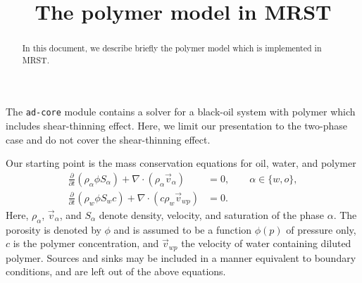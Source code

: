 \documentclass[11pt]{amsart}
\begin{document}
\title[Polymer model]{The polymer model in MRST}

\maketitle

\begin{abstract}
  In this document, we describe briefly the polymer model which is implemented in MRST. 
\end{abstract}

The \texttt{ad-core} module contains a solver for a black-oil system with polymer which includes
shear-thinning effect. Here, we limit our presentation to the two-phase case and do not cover the
shear-thinning effect.

Our starting point is the mass conservation equations for oil, water, and polymer
\begin{align}
  \label{eq:conservation_laws1}
  \frac{\partial}{\partial t} (\rho_{\alpha}\phi S_\alpha) +
  \nabla\cdot(\rho_{\alpha}\vec{v}_\alpha)
  & = 0, \qquad \alpha\in\{w,o\}, \\
  \label{eq:conservation_laws2}
  \frac{\partial}{\partial t} (\rho_{w}\phi S_w c)+\nabla\cdot(c \rho_{w} \vec{v}_{wp}) & = 0.
\end{align}
Here, $\rho_{\alpha}$, $\vec{v}_\alpha$, and $S_\alpha$ denote density, velocity, and saturation of
the phase $\alpha$. The porosity is denoted by $\phi$ and is assumed to be a function $\phi(p)$ of
pressure only, $c$ is the polymer concentration, and $\vec{v}_{wp}$ the velocity of water containing
diluted polymer. Sources and sinks may be included in a manner equivalent to boundary conditions,
and are left out of the above equations.
\end{document}
